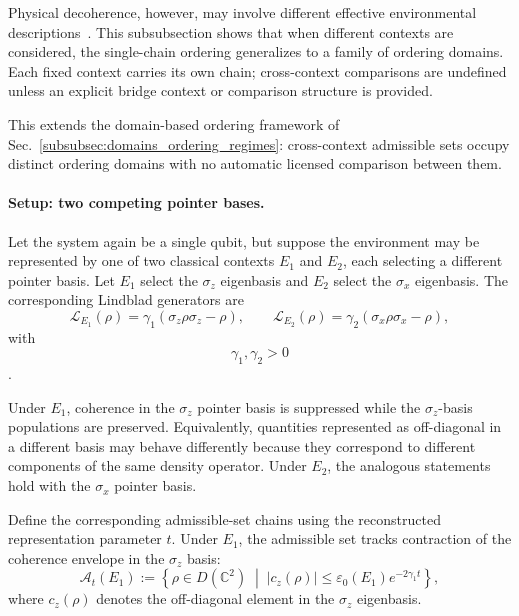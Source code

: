 \documentclass[aps,prx,onecolumn,11pt]{revtex4-2}
\theoremstyle{plain}
\theoremstyle{definition}
\theoremstyle{remark}
\begin{document}
Physical decoherence, however, may involve different effective
environmental descriptions~\cite{BreuerPetruccione2002,Schlosshauer2007}.
This subsubsection shows that when different contexts are considered,
the single-chain ordering generalizes to a family of ordering domains.
Each fixed context carries its own chain; cross-context comparisons are
undefined unless an explicit bridge context or comparison structure is
provided.

This extends the domain-based ordering framework of
Sec.~\ref{subsubsec:domains_ordering_regimes}: cross-context admissible
sets occupy distinct ordering domains with no automatic licensed
comparison between them.

\paragraph{Setup: two competing pointer bases.}

Let the system again be a single qubit, but suppose the environment may
be represented by one of two classical contexts \(E_1\) and \(E_2\),
each selecting a different pointer basis. Let \(E_1\) select the
\(\sigma_z\) eigenbasis and \(E_2\) select the \(\sigma_x\) eigenbasis.
The corresponding Lindblad generators are
\begin{equation}
\mathcal L_{E_1}(\rho)
=
\gamma_1(\sigma_z\rho\sigma_z-\rho),
\qquad
\mathcal L_{E_2}(\rho)
=
\gamma_2(\sigma_x\rho\sigma_x-\rho),
\label{eq:wk_two_context_generators}
\end{equation}
with
\[
\gamma_1,\gamma_2>0
\]
\cite{Lindblad1976,Gorini1976}.

Under \(E_1\), coherence in the \(\sigma_z\) pointer basis is
suppressed while the \(\sigma_z\)-basis populations are preserved.
Equivalently, quantities represented as off-diagonal in a different
basis may behave differently because they correspond to different
components of the same density operator. Under \(E_2\), the analogous
statements hold with the \(\sigma_x\) pointer basis.

Define the corresponding admissible-set chains using the reconstructed
representation parameter \(t\). Under \(E_1\), the admissible set tracks
contraction of the coherence envelope in the \(\sigma_z\) basis:
\begin{equation}
\mathcal A_t(E_1)
:=
\left\{
\rho\in D(\mathbb C^2)
\;\middle|\;
|c_z(\rho)|
\leq
\varepsilon_0(E_1)e^{-2\gamma_1 t}
\right\},
\label{eq:wk_admissible_set_E1}
\end{equation}
where \(c_z(\rho)\) denotes the off-diagonal element in the
\(\sigma_z\) eigenbasis.
\end{document}
